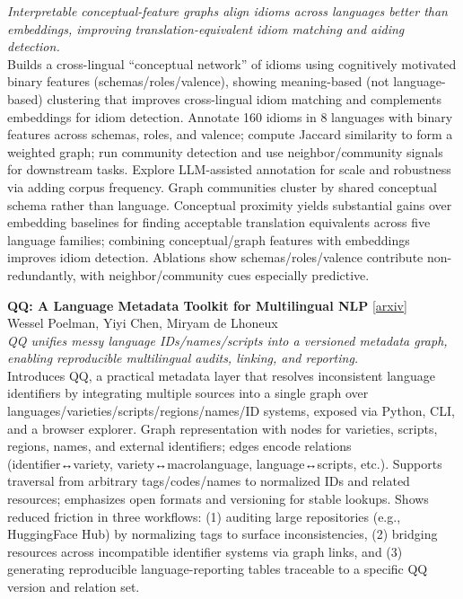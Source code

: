 \documentclass[12pt,letterpaper]{article}
\begin{document}
{\small\textit{Interpretable conceptual-feature graphs align idioms across languages better than embeddings, improving translation-equivalent idiom matching and aiding detection.}}\\[1pt]
{\footnotesize Builds a cross-lingual ``conceptual network'' of idioms using cognitively motivated binary features (schemas/roles/valence), showing meaning-based (not language-based) clustering that improves cross-lingual idiom matching and complements embeddings for idiom detection. Annotate 160 idioms in 8 languages with binary features across schemas, roles, and valence; compute Jaccard similarity to form a weighted graph; run community detection and use neighbor/community signals for downstream tasks. Explore LLM-assisted annotation for scale and robustness via adding corpus frequency. Graph communities cluster by shared conceptual schema rather than language. Conceptual proximity yields substantial gains over embedding baselines for finding acceptable translation equivalents across five language families; combining conceptual/graph features with embeddings improves idiom detection. Ablations show schemas/roles/valence contribute non-redundantly, with neighbor/community cues especially predictive.}

\medskip

{\small\textbf{QQ: A Language Metadata Toolkit for Multilingual NLP}} {\scriptsize[\href{https://arxiv.org/abs/2603.00620}{arxiv}]}\\
{\scriptsize Wessel Poelman, Yiyi Chen, Miryam de Lhoneux}\\

{\small\textit{QQ unifies messy language IDs/names/scripts into a versioned metadata graph, enabling reproducible multilingual audits, linking, and reporting.}}\\[1pt]
{\footnotesize Introduces QQ, a practical metadata layer that resolves inconsistent language identifiers by integrating multiple sources into a single graph over languages/varieties/scripts/regions/names/ID systems, exposed via Python, CLI, and a browser explorer. Graph representation with nodes for varieties, scripts, regions, names, and external identifiers; edges encode relations (identifier↔variety, variety↔macrolanguage, language↔scripts, etc.). Supports traversal from arbitrary tags/codes/names to normalized IDs and related resources; emphasizes open formats and versioning for stable lookups. Shows reduced friction in three workflows: (1) auditing large repositories (e.g., HuggingFace Hub) by normalizing tags to surface inconsistencies, (2) bridging resources across incompatible identifier systems via graph links, and (3) generating reproducible language-reporting tables traceable to a specific QQ version and relation set.}
\end{document}
